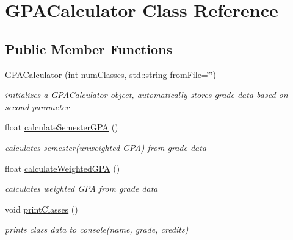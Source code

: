 \hypertarget{class_g_p_a_calculator}{}\section{G\+P\+A\+Calculator Class Reference}
\label{class_g_p_a_calculator}
\subsection*{Public Member Functions}
\begin{DoxyCompactItemize}
\item 
\mbox{\hyperlink{class_g_p_a_calculator_aa9b9dbb521f84cb1a5f48a89f11b453b}{G\+P\+A\+Calculator}} (int num\+Classes, std\+::string from\+File=\char`\"{}\char`\"{})
\begin{DoxyCompactList}\small\item\em initializes a \mbox{\hyperlink{class_g_p_a_calculator}{G\+P\+A\+Calculator}} object, automatically stores grade data based on second parameter \end{DoxyCompactList}\item 
float \mbox{\hyperlink{class_g_p_a_calculator_a225157e7c4783271b58ebeb7572c0796}{calculate\+Semester\+G\+PA}} ()
\begin{DoxyCompactList}\small\item\em calculates semester(unweighted G\+P\+A) from grade data \end{DoxyCompactList}\item 
float \mbox{\hyperlink{class_g_p_a_calculator_a8657e3921e17081722511a9be4175a24}{calculate\+Weighted\+G\+PA}} ()
\begin{DoxyCompactList}\small\item\em calculates weighted G\+PA from grade data \end{DoxyCompactList}\item 
void \mbox{\hyperlink{class_g_p_a_calculator_acadc3a8b84d397760ba90706f4eda0ba}{print\+Classes}} ()
\begin{DoxyCompactList}\small\item\em prints class data to console(name, grade, credits) \end{DoxyCompactList}\end{DoxyCompactItemize}
